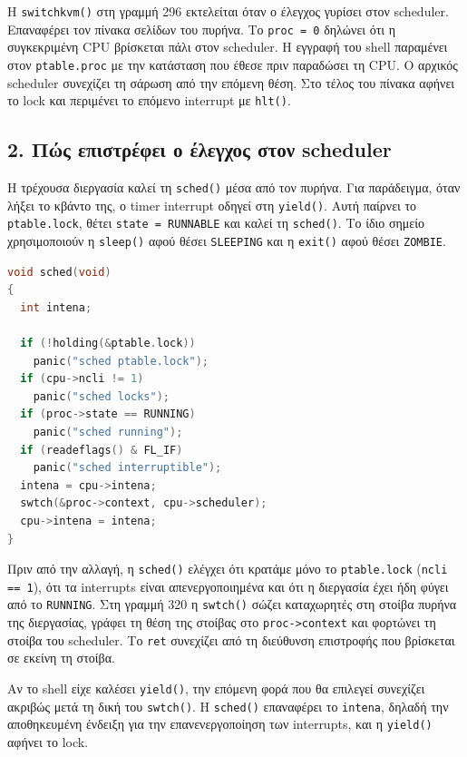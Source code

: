 \documentclass[11pt,a4paper]{article}
\begin{document}
Η \texttt{switchkvm()} στη γραμμή 296 εκτελείται όταν ο έλεγχος γυρίσει στον scheduler. Επαναφέρει τον πίνακα σελίδων του πυρήνα. Το \texttt{proc = 0} δηλώνει ότι η συγκεκριμένη CPU βρίσκεται πάλι στον scheduler. Η εγγραφή του shell παραμένει στον \texttt{ptable.proc} με την κατάσταση που έθεσε πριν παραδώσει τη CPU. Ο αρχικός scheduler συνεχίζει τη σάρωση από την επόμενη θέση. Στο τέλος του πίνακα αφήνει το lock και περιμένει το επόμενο interrupt με \texttt{hlt()}.

\clearpage
\subsection*{2. Πώς επιστρέφει ο έλεγχος στον scheduler}
Η τρέχουσα διεργασία καλεί τη \texttt{sched()} μέσα από τον πυρήνα. Για παράδειγμα, όταν λήξει το κβάντο της, ο timer interrupt οδηγεί στη \texttt{yield()}. Αυτή παίρνει το \texttt{ptable.lock}, θέτει \texttt{state = RUNNABLE} και καλεί τη \texttt{sched()}. Το ίδιο σημείο χρησιμοποιούν η \texttt{sleep()} αφού θέσει \texttt{SLEEPING} και η \texttt{exit()} αφού θέσει \texttt{ZOMBIE}.

\begin{lstlisting}[language=C,firstnumber=307,basicstyle=\ttfamily\scriptsize,lineskip=-0.7pt]
void sched(void)
{
  int intena;

  if (!holding(&ptable.lock))
    panic("sched ptable.lock");
  if (cpu->ncli != 1)
    panic("sched locks");
  if (proc->state == RUNNING)
    panic("sched running");
  if (readeflags() & FL_IF)
    panic("sched interruptible");
  intena = cpu->intena;
  swtch(&proc->context, cpu->scheduler);
  cpu->intena = intena;
}
\end{lstlisting}

Πριν από την αλλαγή, η \texttt{sched()} ελέγχει ότι κρατάμε μόνο το \texttt{ptable.lock} (\texttt{ncli == 1}), ότι τα interrupts είναι απενεργοποιημένα και ότι η διεργασία έχει ήδη φύγει από το \texttt{RUNNING}. Στη γραμμή 320 η \texttt{swtch()} σώζει καταχωρητές στη στοίβα πυρήνα της διεργασίας, γράφει τη θέση της στοίβας στο \texttt{proc->context} και φορτώνει τη στοίβα του scheduler. Το \texttt{ret} συνεχίζει από τη διεύθυνση επιστροφής που βρίσκεται σε εκείνη τη στοίβα.

Αν το shell είχε καλέσει \texttt{yield()}, την επόμενη φορά που θα επιλεγεί συνεχίζει ακριβώς μετά τη δική του \texttt{swtch()}. Η \texttt{sched()} επαναφέρει το \texttt{intena}, δηλαδή την αποθηκευμένη ένδειξη για την επανενεργοποίηση των interrupts, και η \texttt{yield()} αφήνει το lock.
\end{document}
